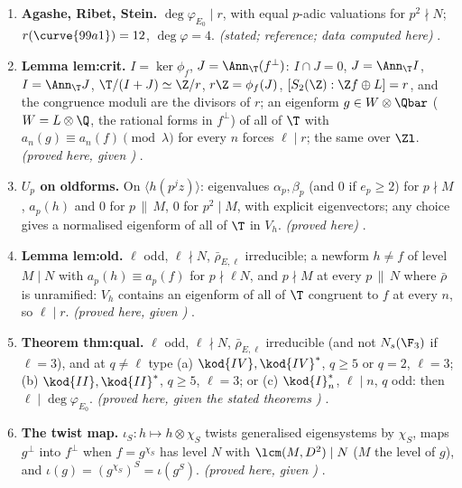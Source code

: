 \begin{enumerate}[label=\textbf{\thechapter.\arabic*}]
\item \textbf{Agashe, Ribet, Stein.} $\deg\varphi_{E_0}\mid r$, with equal $p$-adic valuations for $p^2\nmid N$; $r(\curve{99a1})=12$, $\deg\varphi=4$. \emph{(stated; reference; data computed here)}
.
\item \textbf{Lemma lem:crit.} $I=\ker\phi_f$, $J=\Ann_\T(f^\perp)$: $I\cap J=0$, $J=\Ann_\T I$, $I=\Ann_\T J$, $\T/(I+J)\simeq\Z/r$, $r\Z=\phi_f(J)$, $[S_2(\Z):\Z f\oplus L]=r$, and the congruence moduli
are the divisors of $r$; an eigenform $g\in W\otimes\Qbar$ ($W=L\otimes\Q$, the rational forms in $f^\perp$) of all of $\T$ with $a_n(g)\equiv a_n(f)\pmod\lambda$ for every $n$ forces $\ell\mid r$; the same over $\Zl$. \emph{(proved here, given
)} .
\item \textbf{$U_p$ on oldforms.} On $\langle h(p^jz)\rangle$: eigenvalues $\alpha_p,\beta_p$ (and $0$ if $e_p\ge2$) for $p\nmid M$, $a_p(h)$ and $0$ for $p\,\|\,M$, $0$ for $p^2\mid M$, with explicit
eigenvectors; any choice gives a normalised eigenform of all of $\T$ in $V_h$. \emph{(proved here)} .
\item \textbf{Lemma lem:old.} $\ell$ odd, $\ell\nmid N$, $\bar\rho_{E,\ell}$ irreducible; a newform $h\ne f$ of level $M\mid N$ with $a_p(h)\equiv a_p(f)$ for $p\nmid\ell N$, and $p\nmid M$ at every $p\,\|\,N$ where $\bar\rho$ is
unramified: $V_h$ contains an eigenform of all of $\T$ congruent to $f$ at every $n$, so $\ell\mid r$. \emph{(proved here, given )}
.
\item \textbf{Theorem thm:qual.} $\ell$ odd, $\ell\nmid N$, $\bar\rho_{E,\ell}$ irreducible (and not $N_s(\F_3)$ if $\ell=3$), and at $q\ne\ell$ type (a) $\kod{IV},\kod{IV}^*$, $q\ge5$ or $q=2$, $\ell=3$; (b)
$\kod{II},\kod{II}^*$, $q\ge5$, $\ell=3$; or (c) $\kod{I}_n^*$, $\ell\mid n$, $q$ odd: then $\ell\mid\deg\varphi_{E_0}$. \emph{(proved here, given the stated theorems
)} .
\item \textbf{The twist map.} $\iota_S\colon h\mapsto h\otimes\chi_S$ twists generalised eigensystems by $\chi_S$, maps $g^\perp$ into $f^\perp$ when $f=g^{\chi_S}$ has level $N$ with
$\lcm(M,D^2)\mid N$ ($M$ the level of $g$), and $\iota(g)=(g^{\chi_S})^S=\iota(g^S)$. \emph{(proved
here, given )} .

\end{enumerate}
